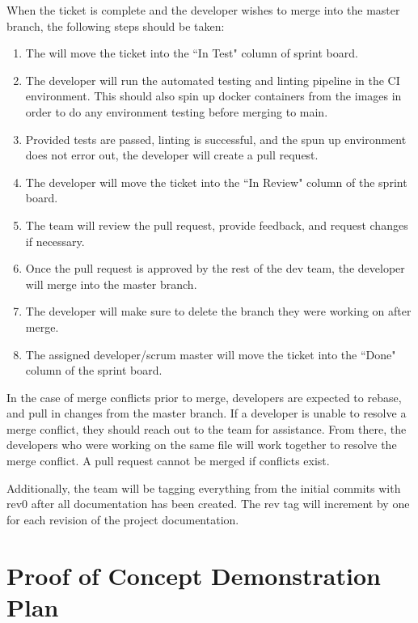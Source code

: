 \documentclass{article}
\begin{document}
When the ticket is complete and the developer wishes to merge into the master branch, the following steps should be taken:
\begin{enumerate}
	\item The will move the ticket into the ``In Test" column of sprint board.
	\item The developer will run the automated testing and linting pipeline in the CI environment.
	This should also spin up docker containers from the images in order to do any environment testing before merging to main.
	\item Provided tests are passed, linting is successful, and the spun up environment does not error out, the developer will create a pull request.
	\item The developer will move the ticket into the ``In Review" column of the sprint board.
	\item The team will review the pull request, provide feedback, and request changes if necessary. 
	\item Once the pull request is approved by the rest of the dev team, the developer will merge into the master branch.
	\item The developer will make sure to delete the branch they were working on after merge.
	\item The assigned developer/scrum master will move the ticket into the ``Done" column of the sprint board.
\end{enumerate}

In the case of merge conflicts prior to merge, developers are expected to rebase, and pull in changes from the master branch.
If a developer is unable to resolve a merge conflict, they should reach out to the team for assistance. 
From there, the developers who were working on the same file will work together to resolve the merge conflict. 
A pull request cannot be merged if conflicts exist.

Additionally, the team will be tagging everything from the initial commits with rev0 after all documentation has been created. 
The rev tag will increment by one for each revision of the project documentation.

\section{Proof of Concept Demonstration Plan}
\end{document}
